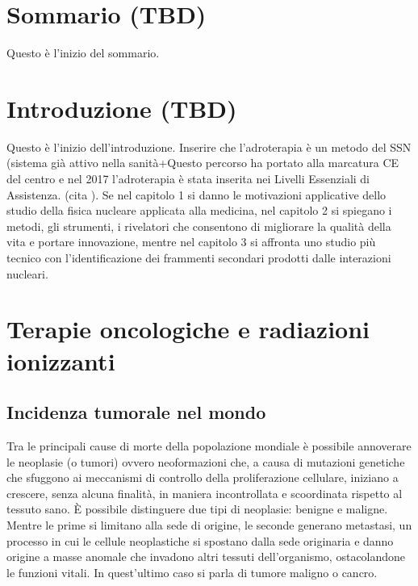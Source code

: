 \documentclass[12pt,a4paper,twoside]{report}
\begin{document}
	\chapter*{Sommario (TBD)}
		Questo è l'inizio del sommario.
	\newpage
	\tableofcontents
	\newpage
	\chapter*{Introduzione (TBD)}
		Questo è l'inizio dell'introduzione. Inserire che l'adroterapia è un metodo del SSN (sistema già attivo nella sanità+Questo percorso ha portato alla marcatura CE del centro e nel 2017 l'adroterapia è stata inserita nei Livelli Essenziali di Assistenza.
		(cita
		). Se nel capitolo 1 si danno le motivazioni applicative dello studio della fisica nucleare applicata alla medicina, nel capitolo 2 si spiegano i metodi, gli strumenti, i rivelatori che consentono di migliorare la qualità della vita e portare innovazione, mentre nel capitolo 3 si affronta uno studio più tecnico con l'identificazione dei frammenti secondari prodotti dalle interazioni nucleari.
	\newpage
	
	
	\chapter{Terapie oncologiche e radiazioni ionizzanti}\label{cap:1}
	\section{Incidenza tumorale nel mondo}\label{sec:1.1}
	Tra le principali cause di morte della popolazione mondiale è possibile annoverare le neoplasie (o tumori) ovvero neoformazioni che, a causa di mutazioni genetiche che sfuggono ai meccanismi di controllo della proliferazione cellulare, iniziano a crescere, senza alcuna finalità, in maniera incontrollata e scoordinata rispetto al tessuto sano. \`E possibile distinguere due tipi di neoplasie: benigne e maligne. Mentre le prime si limitano alla sede di origine, le seconde generano metastasi, un processo in cui le cellule neoplastiche si spostano dalla sede originaria e danno origine a masse anomale che invadono altri tessuti dell'organismo, ostacolandone le funzioni vitali. In quest'ultimo caso si parla di tumore maligno o cancro.
	
\end{document}
